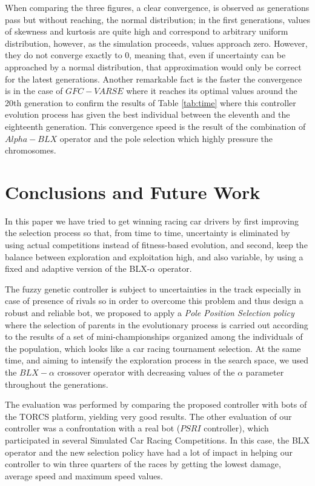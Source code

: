 \documentclass[10pt,journal,compsoc]{IEEEtran}
\begin{document}
When comparing the three figures, a clear convergence, 
is observed as generations pass but without reaching, the normal distribution; in the first
generations, values of skewness and kurtosis are quite
high and correspond to arbitrary uniform distribution, however, as the simulation proceeds, values
approach zero. However, they do not converge
exactly to 0, meaning that, even if uncertainty can be
approached by a normal distribution, that approximation
would only be correct for the latest generations\cite{noisylunch2015}.
Another remarkable fact is the faster the convergence is in the case of $GFC-VARSE$ where it reaches its optimal values around the 20th generation to confirm the results of Table \ref{tab:time} where this controller evolution process has given the best individual between the eleventh and the eighteenth generation.
This convergence speed is the result of the combination of $Alpha-BLX$ operator and the pole selection which highly pressure the chromosomes.

\section{Conclusions and Future Work} 
\label{sec:conclusions}



In this paper we have tried to get winning racing car drivers by
first improving the selection process so that, from time to time,
uncertainty is eliminated by using actual competitions instead of
fitness-based evolution, and second, keep the balance between
exploration and exploitation high, and also variable, by using a fixed
and adaptive version of the BLX-$\alpha$ operator.

The fuzzy genetic controller is subject to uncertainties in the track especially in case of presence of rivals so in order to overcome this problem and thus design a robust and reliable bot, we proposed to apply a \textit{Pole Position Selection policy} where the selection of parents in the evolutionary process is carried out according to the results of a set of mini-championships organized among the individuals of the population, which looks like a car racing tournament selection.
At the same time, and aiming to intensify the exploration process in the search space, we used the $BLX-\alpha$ crossover operator with decreasing values of the $\alpha$ parameter throughout the generations.

The evaluation was performed by comparing the proposed controller with bots of the TORCS platform, yielding very good results.
The other evaluation of our controller was a confrontation with a real bot ($PSRI$ controller), which participated in several Simulated Car Racing Competitions. In this case, the BLX operator and the new selection policy have had a lot of impact in helping our controller to win three quarters of the races by getting the lowest damage, average speed and maximum speed values.
\end{document}
